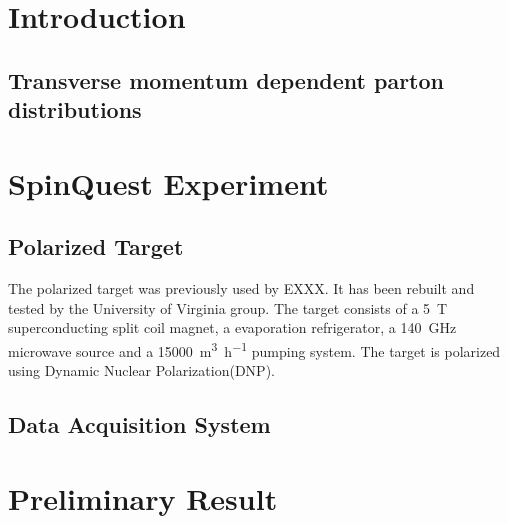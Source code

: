 \section{Introduction}

\subsection{Transverse momentum dependent parton distributions}

\section{SpinQuest Experiment}

\subsection{Polarized Target}
The polarized target was previously used by EXXX.  It has been rebuilt and tested by the University of 
Virginia group. The target consists of a \SI{5}{\tesla} superconducting 
split coil magnet, a   evaporation refrigerator, a \SI{140}{\GHz} 
microwave source and a \SI{15000}{\cubic\meter\per\hour} pumping system. The 
target is polarized using Dynamic Nuclear Polarization(DNP)\cite{crabb1995}.

\subsection{Data Acquisition System}

\section{Preliminary Result}
